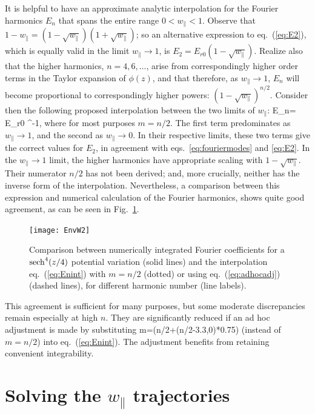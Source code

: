 \documentclass{agujournal2019}
\let\oldequation\equation
\let\oldendequation\endequation
\renewenvironment{equation}
  {\linenomathNonumbers\oldequation}
  {\oldendequation\endlinenomath}
\def\wp{w_\parallel}
\begin{document}
It is helpful to have an approximate analytic interpolation for the Fourier
harmonics $E_n$ that spans the entire range $0<\wp<1$. Observe
that $1-\wp=(1-\sqrt{\wp})(1+\sqrt{\wp})$; so
an alternative expression to eq.\ (\ref{eq:E2}), which is equally
valid in the limit $\wp\to 1$, is
$E_2=E_{r0}(1-\sqrt{\wp})$. Realize also that the higher
harmonics, $n=4,6,\dots$, arise from correspondingly higher order
terms in the Taylor expansion of $\phi(z)$, and that therefore, as 
$\wp\to 1$, $E_n$ will become proportional to correspondingly
higher powers:
$(1-\sqrt{\wp})^{n/2}$. Consider then the following proposed interpolation
between the two limits of $\wp$:
\begin{equation}
  \label{eq:Enint}
  E_n= E_{r0} \left[ {n/2\over(1-\sqrt{\wp})^m} + {\pi\over8}{1\over\sqrt{\wp}}\right]^{-1},
\end{equation}
where for most purposes $m=n/2$.
The first term predominates as $\wp\to1$, and the second as
$\wp\to0$. In their respective limits, these two terms give
the correct values for $E_2$, in agreement with eqs.\
\ref{eq:fouriermodes} and \ref{eq:E2}. In the $\wp\to1$ limit,
the higher harmonics have appropriate scaling with
$1-\sqrt{\wp}$. Their numerator $n/2$ has not been
derived; and, more crucially, neither has the inverse form of the
interpolation. Nevertheless, a comparison between this expression and
numerical calculation of the Fourier harmonics, shows quite good
agreement, as can be seen in Fig.\ \ref{fig:Enint}.
\begin{figure}%
  \centering
  \texttt{[image: EnvW2]}
  \caption{Comparison between numerically integrated Fourier
    coefficients for a ${\rm sech}^4(z/4)$ potential variation (solid
    lines) and the interpolation eq.\ (\ref{eq:Enint}) with $m=n/2$
    (dotted) or using eq.\ (\ref{eq:adhocadj})  (dashed lines),
    for different harmonic number (line labels).}
  \label{fig:Enint}
\end{figure}
This agreement is sufficient for many purposes, but some moderate
discrepancies remain especially at high $n$. They are significantly
reduced if an ad hoc adjustment is made by substituting
\begin{equation}
  \label{eq:adhocadj}
  m=(n/2+(n/2-3.3,0)*0.75)  
\end{equation}
(instead of
$m=n/2$) into eq.\ (\ref{eq:Enint}). The adjustment benefits from
retaining convenient integrability.

\section{Solving the $\wp$ trajectories}
\end{document}
